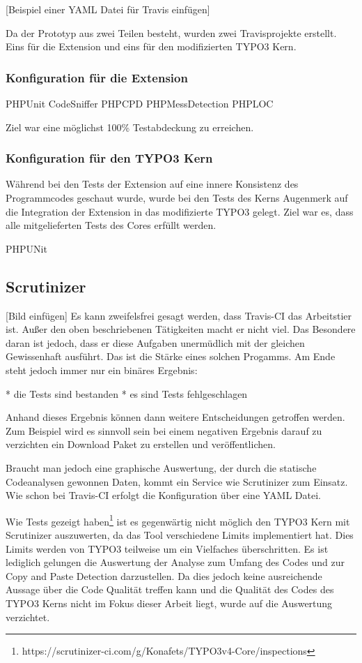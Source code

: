 [Beispiel einer YAML Datei für Travis einfügen]

Da der Prototyp aus zwei Teilen besteht, wurden zwei Travisprojekte erstellt. Eins für die Extension und eins für den modifizierten TYPO3 Kern.

\subsubsection{Konfiguration für die Extension}
PHPUnit
CodeSniffer
PHPCPD
PHPMessDetection
PHPLOC

Ziel war eine möglichst 100\% Testabdeckung zu erreichen.

\subsubsection{Konfiguration für den TYPO3 Kern}
Während bei den Tests der Extension auf eine innere Konsistenz des Programmcodes geschaut wurde, wurde bei den Tests des Kerns Augenmerk auf die Integration der Extension in das modifizierte TYPO3 gelegt. Ziel war es, dass alle mitgelieferten Tests des Cores erfüllt werden.

PHPUNit

\subsection{Scrutinizer}
[Bild einfügen]
Es kann zweifelsfrei gesagt werden, dass Travis-CI das Arbeitstier ist. Außer den oben beschriebenen Tätigkeiten macht er nicht viel. Das Besondere daran ist jedoch, dass er diese Aufgaben unermüdlich mit der gleichen Gewissenhaft ausführt. Das ist die Stärke eines solchen Progamms. Am Ende steht jedoch immer nur ein binäres Ergebnis:

* die Tests sind bestanden
* es sind Tests fehlgeschlagen

Anhand dieses Ergebnis können dann weitere Entscheidungen getroffen werden. Zum Beispiel wird es sinnvoll sein bei einem negativen Ergebnis darauf zu verzichten ein Download Paket zu erstellen und veröffentlichen.

Braucht man jedoch eine graphische Auswertung, der durch die statische Codeanalysen gewonnen Daten, kommt ein Service wie Scrutinizer zum Einsatz. Wie schon bei Travis-CI erfolgt die Konfiguration über eine YAML Datei.

Wie Tests gezeigt haben\footnote{https://scrutinizer-ci.com/g/Konafets/TYPO3v4-Core/inspections} ist es gegenwärtig nicht möglich den TYPO3 Kern mit Scrutinizer auszuwerten, da das Tool verschiedene Limits implementiert hat. Dies Limits werden von TYPO3 teilweise um ein Vielfaches überschritten. Es ist lediglich gelungen die Auswertung der Analyse zum Umfang des Codes und zur Copy and Paste Detection darzustellen. Da dies jedoch keine ausreichende Aussage über die Code Qualität treffen kann und die Qualität des Codes des TYPO3 Kerns nicht im Fokus dieser Arbeit liegt, wurde auf die Auswertung verzichtet.

